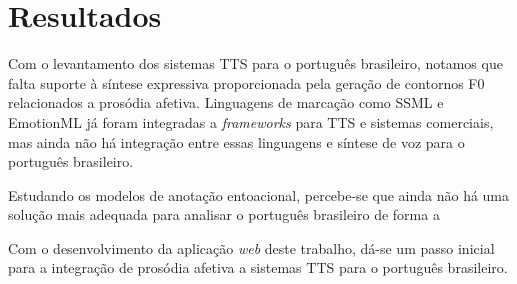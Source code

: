 
\chapter{Resultados}

Com o levantamento dos sistemas TTS para o português brasileiro, notamos que
falta suporte à síntese expressiva proporcionada pela geração de contornos F0
relacionados a prosódia afetiva. Linguagens de marcação como SSML e EmotionML já
foram integradas a \emph{frameworks} para TTS e sistemas comerciais, mas ainda
não há integração entre essas linguagens e síntese de voz para o português brasileiro.

Estudando os modelos de anotação entoacional, percebe-se que ainda não há uma
solução mais adequada para analisar o português brasileiro de forma a 

Com o desenvolvimento da aplicação \emph{web} deste trabalho, dá-se um passo
inicial para a integração de prosódia afetiva a sistemas TTS para o português brasileiro.